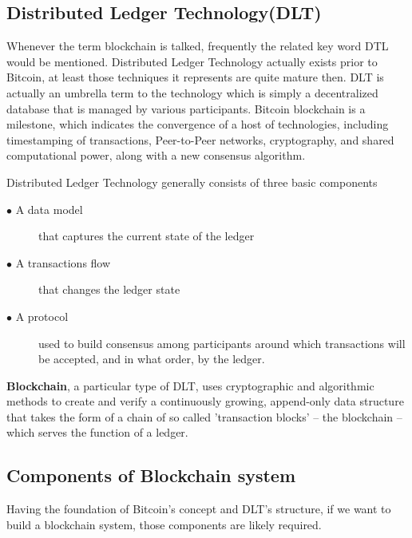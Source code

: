 \subsection{Distributed Ledger Technology(DLT)}
Whenever the term blockchain is talked, frequently the related key word DTL would be mentioned.
Distributed Ledger Technology actually exists prior to Bitcoin, at least those techniques it represents are quite mature then. DLT is actually an umbrella term to the technology which is simply a decentralized database that is managed by various participants. Bitcoin blockchain is a milestone, which indicates the convergence of a host of technologies, including timestamping of transactions, Peer-to-Peer networks, cryptography, and shared computational power, along with a new consensus algorithm.

Distributed Ledger Technology generally consists of three basic components\cite{sawtooth}
\begin{description}
	\item [$\bullet$ A data model]that captures the current state of the ledger
	\item [$\bullet$ A transactions flow] that changes the ledger state
	\item [$\bullet$ A protocol] used to build consensus among participants around which transactions will be accepted, and in what order, by the ledger.
\end{description}
\textbf{Blockchain}, a particular
type of DLT, uses cryptographic and algorithmic methods to create and verify a continuously growing, append-only data structure that takes the form of a chain of so
called 'transaction blocks' – the blockchain – which serves the function of a ledger.\cite{WBank}

\subsection{Components of Blockchain system}
Having the foundation of Bitcoin's concept and DLT's structure, if we want to build a blockchain system, those components are likely required.

